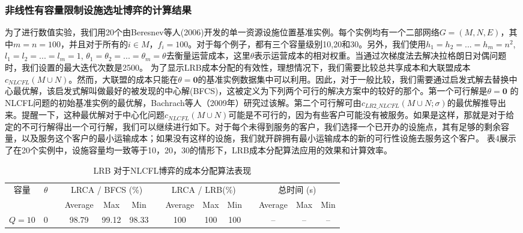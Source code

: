 \documentclass[UTF8]{article}
\begin{document}
\begin{定义}
      \subsubsection{非线性有容量限制设施选址博弈的计算结果}\label{sec:nlcflcomputation}
      为了进行数值实验，我们用20个由Beresnev等人(2006)开发的单一资源设施位置基准实例。每个实例均有一个二部网络$G=(M,N,E)$，其中$m=n=100$，并且对于所有的$i \in M$，$f_i=100$。对于每个例子，都有三个容量级别10,20和30。另外，我们使用$h_1 = h_2 = ... = h_m = n^2$, $l_1 = l_2= ... = l_m = 1$, $\theta_1 = \theta_2 = ... = \theta_m=\theta$去衡量运营成本，这里$\theta$表示运营成本的相对权重。当通过次梯度法去解决拉格朗日对偶问题时，我们设置的最大迭代次数是2500。
      为了显示LRB成本分配的有效性，理想情况下，我们需要比较总共享成本和大联盟成本$c_{NLCFL}(M \cup N)$。然而，大联盟的成本只能在$\theta=\textbf{0}$的基准实例数据集中可以利用。因此，对于一般比较，我们需要通过启发式解去替换中心最优解，该启发式解叫做最好的被发现的中心解(BFCS)，这被定义为下列两个可行的解决方案中的较好的那个。第一个可行解是$\theta = \textbf{0}$ 的NLCFL问题的初始基准实例的最优解，Bachrach等人（2009年）研究过该解。第二个可行解可由$c_{LR2\_NLCFL}(M \cup N;\sigma)$的最优解推导出来。提醒一下，这种最优解对于中心化问题$c_{NLCFL}(M \cup N)$可能是不可行的，因为有些客户可能没有被服务。如果是这样，那就是对于给定的不可行解得出一个可行解，我们可以继续进行如下。对于每个未得到服务的客户，我们选择一个已开办的设施点，其有足够的剩余容量，以及服务这个客户的最小运输成本；如果没有这样的设施，我们就开辟拥有最小运输成本的新的可行性设施去服务这个客户。
      表4展示了在20个实例中，设施容量均一致等于10，20，30的情形下，LRB成本分配算法应用的效果和计算效率。
      \begin{table}[H]
      \vspace{-2mm}
      \centering
      \tabcolsep=6pt
      \small
      \renewcommand\arraystretch{1.4}
      \caption{\label{table:LRBNSG} LRB 对于NLCFL博弈的成本分配算法表现}
      \begin{tabular}[!h]{c c c c c c c c c c c c c c}
      \hline
      \multirow{2}{*}{容量} &\multirow{2}{*}{$\theta$} &\multicolumn{1}{c}{} & \multicolumn{3}{c}{LRCA / BFCS (\%)} &\multicolumn{1}{c}{} & \multicolumn{3}{c}{LRCA / LRB(\%)}  &\multicolumn{1}{c}{} & \multicolumn{3}{c}{总时间 (s)}\\
      \cline{4-6}
      \cline{8-10}
      \cline{12-14}
      & & & Average & Max &Min	& & Average & Max &Min & & Average & Max &Min\\
      \hline
      \multirow{5}{*}{$Q=10$}
      &0  &  &98.79	&99.12	&98.33	&	&100	&100	&100	&	&--	&--	&--\\


\end{tabular}
\end{table}
\end{定义}
\end{document}
